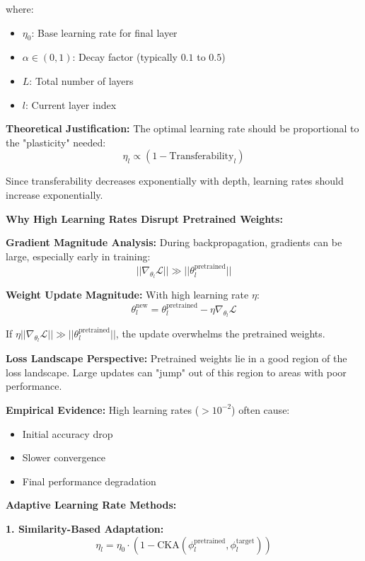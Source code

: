 \documentclass[12pt]{article}
\begin{document}
\begin{enumerate}[(a)]
{    where:
    \begin{itemize}
        \item $\eta_0$: Base learning rate for final layer
        \item $\alpha \in (0,1)$: Decay factor (typically $0.1$ to $0.5$)
        \item $L$: Total number of layers
        \item $l$: Current layer index
    \end{itemize}
    
    \textbf{Theoretical Justification:}
    The optimal learning rate should be proportional to the "plasticity" needed:
    $$\eta_l \propto (1 - \text{Transferability}_l)$$
    
    Since transferability decreases exponentially with depth, learning rates should increase exponentially.
    
    \textbf{Why High Learning Rates Disrupt Pretrained Weights:}
    
    \textbf{Gradient Magnitude Analysis:}
    During backpropagation, gradients can be large, especially early in training:
    $$||\nabla_{\theta_l} \mathcal{L}|| \gg ||\theta_l^{\text{pretrained}}||$$
    
    \textbf{Weight Update Magnitude:}
    With high learning rate $\eta$:
    $$\theta_l^{\text{new}} = \theta_l^{\text{pretrained}} - \eta \nabla_{\theta_l} \mathcal{L}$$
    
    If $\eta ||\nabla_{\theta_l} \mathcal{L}|| \gg ||\theta_l^{\text{pretrained}}||$, the update overwhelms the pretrained weights.
    
    \textbf{Loss Landscape Perspective:}
    Pretrained weights lie in a good region of the loss landscape. Large updates can "jump" out of this region to areas with poor performance.
    
    \textbf{Empirical Evidence:}
    High learning rates ($>10^{-2}$) often cause:
    \begin{itemize}
        \item Initial accuracy drop
        \item Slower convergence
        \item Final performance degradation
    \end{itemize}
    
    \textbf{Adaptive Learning Rate Methods:}
    
    \textbf{1. Similarity-Based Adaptation:}
    $$\eta_l = \eta_0 \cdot (1 - \text{CKA}(\phi_l^{\text{pretrained}}, \phi_l^{\text{target}}))$$
    
}
\end{enumerate}
\end{document}
